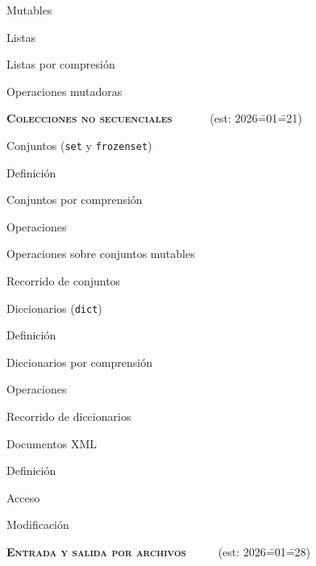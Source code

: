 \begin{longenum}
\begin{longenum}
        \item Mutables
        \begin{longenum}
            \item Listas
            \begin{longenum}
                \item Listas por compresión
            \end{longenum}
            \item Operaciones mutadoras
        \end{longenum}
    \end{longenum}
    \item \textbf{\textsc{Colecciones no secuenciales}} \ \ \ \ \ \ (est: 2026\==01\==21)
    \begin{longenum}
        \item Conjuntos (\texttt{set} y \texttt{frozenset})
        \begin{longenum}
            \item Definición
            \item Conjuntos por comprensión
            \item Operaciones
            \item Operaciones sobre conjuntos mutables
            \item Recorrido de conjuntos
        \end{longenum}
        \item Diccionarios (\texttt{dict})
        \begin{longenum}
            \item Definición
            \item Diccionarios por comprensión
            \item Operaciones
            \item Recorrido de diccionarios
        \end{longenum}
        \item Documentos XML
        \begin{longenum}
            \item Definición
            \item Acceso
            \item Modificación
        \end{longenum}
    \end{longenum}
    \item \textbf{\textsc{Entrada y salida por archivos}} \ \ \ \ \ (est: 2026\==01\==28)

\end{longenum}
